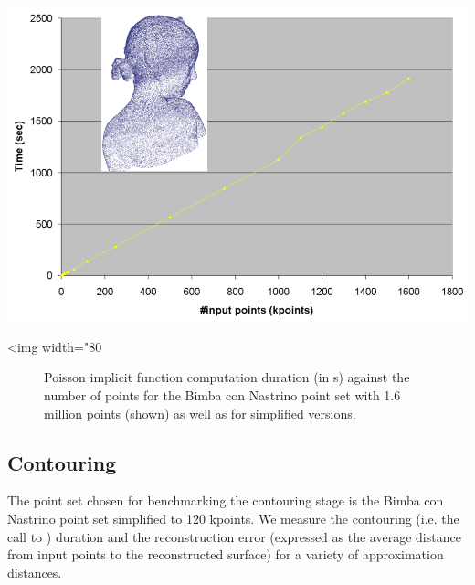 \begin{center}
    \label{Surface_reconstruction_points_3-fig-poisson_bench}
    \begin{ccTexOnly}
      \includegraphics[width=1.0\textwidth]{Surface_reconstruction_points_3/poisson_bench}
    \end{ccTexOnly}
    \begin{ccHtmlOnly}
        <img width="80%
    \end{ccHtmlOnly}
    \begin{figure}[h]
        \caption{Poisson implicit function computation duration (in s)
                 against the number of points  for the Bimba con Nastrino
                 point set with 1.6 million points (shown)
                 as well as for simplified versions.}
    \end{figure}
\end{center}



\subsection{Contouring}

The point set chosen for benchmarking the contouring stage is the Bimba con Nastrino point set simplified to 120 kpoints. We measure the contouring (i.e. the call to ) duration and the reconstruction error (expressed as the average distance from input points to the reconstructed surface) for a variety of approximation distances.

